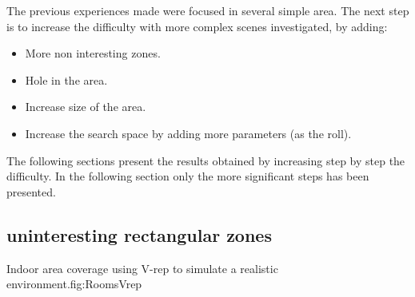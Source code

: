  The previous experiences made were focused in several simple area. The next step is to increase the difficulty  with more complex scenes investigated, by adding:
\begin{itemize}
\item More non interesting zones.
\item Hole in the area.
\item Increase size of the area.
\item Increase the search space by adding more parameters (as the roll). 
\end{itemize} 
The following sections present the results obtained by increasing step by step the difficulty. %
In the following section only the more significant steps has been presented.

	\subsection{uninteresting  rectangular zones} \label{sec:expRectObstacle}
	\begin{mfigures}[!]{Indoor area coverage using V-rep to simulate a realistic environment.}{fig:RoomsVrep} \centering
{}
\hspace{1cm}
\hspace{1cm}

\tabsimuposeVrep
\end{mfigures}
	
